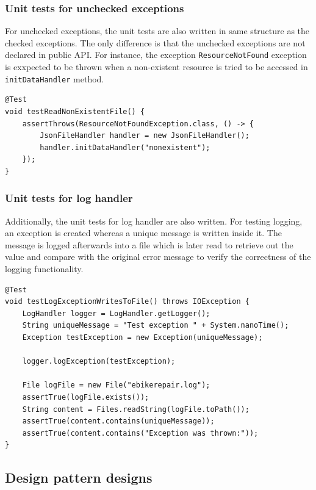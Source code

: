 \documentclass[a4paper]{scrartcl}
\begin{document}
\subsubsection{Unit tests for unchecked exceptions}

For unchecked exceptions, the unit tests are also written in same structure as the checked exceptions. The only difference is that the unchecked exceptions are not declared in public API. For instance, the exception \texttt{ResourceNotFound} exception is exxpected to be thrown when a non-existent resource is tried to be accessed in \texttt{initDataHandler} method. 

\begin{lstlisting}[style=javastyle, caption={unit test for ResourceNotFoundException class}]
@Test
void testReadNonExistentFile() {
    assertThrows(ResourceNotFoundException.class, () -> {
        JsonFileHandler handler = new JsonFileHandler();
        handler.initDataHandler("nonexistent");
    });
}
\end{lstlisting}

\subsubsection{Unit tests for log handler}
Additionally, the unit tests for log handler are also written. For testing logging, an exception is created whereas a unique message is written inside it. The message is logged afterwards into a file which is later read to retrieve out the value and compare with the original error message to verify the correctness of the logging functionality.

\begin{lstlisting}[style=javastyle, caption={Unit test for writing logging}]
@Test
void testLogExceptionWritesToFile() throws IOException {
    LogHandler logger = LogHandler.getLogger();
    String uniqueMessage = "Test exception " + System.nanoTime();
    Exception testException = new Exception(uniqueMessage);

    logger.logException(testException);

    File logFile = new File("ebikerepair.log");
    assertTrue(logFile.exists());
    String content = Files.readString(logFile.toPath());
    assertTrue(content.contains(uniqueMessage));
    assertTrue(content.contains("Exception was thrown:"));
}
\end{lstlisting}

\subsection{Design pattern designs}
\end{document}
